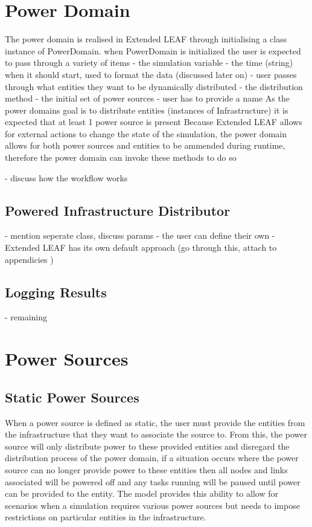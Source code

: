 \documentclass{l4proj}
\begin{document}
\section{Power Domain}\label{sec:power-domain}
The power domain is realised in Extended LEAF through initialising a class instance of PowerDomain.
when PowerDomain is initialized the user is expected to pass through a variety of items
- the simulation variable
- the time (string) when it should start, used to format the data (discussed later on)
- user passes through what entities they want to be dynamically distributed
- the distribution method
- the initial set of power sources
-  user has to provide a name
As the power domains goal is to distribute entities (instances of Infrastructure) it is expected that at least 1 power source is present
Because Extended LEAF allows for external actions to change the state of the simulation, the power domain allows for both power sources and entities to be ammended during runtime, therefore the power domain can invoke these methods to do so

- discuss how the workflow works
\subsection{Powered Infrastructure Distributor}\label{imp:subsec:distributor}
- mention seperate class, discuss params
- the user can define their own
- Extended LEAF has its own default approach
(go through this, attach to appendicies )

\subsection{Logging Results}\label{imp:subsec:logging-results}
- remaining

\section{Power Sources}\label{sec:power-sources}

\subsection{Static Power Sources}\label{imp:subsec:static-power-sources}
When a power source is defined as static, the user must provide the entities from the infrastructure that they want to associate the source to.
From this, the power source will only distribute power to these provided entities and disregard the distribution process of the power domain, if a situation occurs where the power source can no longer provide power to these entities then all nodes and links associated will be powered off and any tasks running will be paused until power can be provided to the entity.
The model provides this ability to allow for scenarios when a simulation requires various power sources but needs to impose restrictions on particular entities in the infrastructure.
\end{document}
